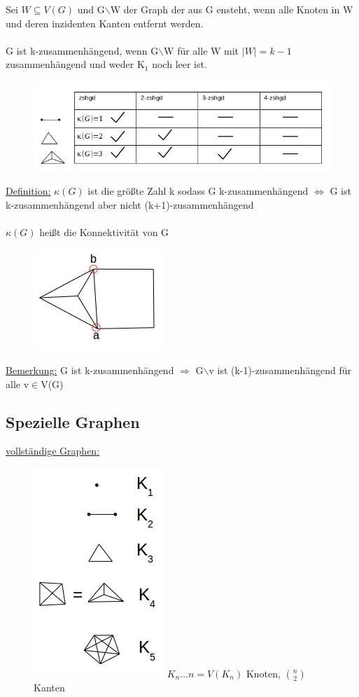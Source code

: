 Sei $W \subseteq V(G)$ und G$\backslash$W der Graph der aus G ensteht, wenn alle Knoten in W und deren inzidenten Kanten entfernt werden.
\\\\
G ist k-zusammenhängend, wenn G$\backslash$W für alle W mit $|W| = k-1$ zusammenhängend und weder K$_1$ noch leer ist.
\begin{figure}[htp]
\centering
\includegraphics[scale=1]{lectures/161021/pix/pic7.jpg}
\end{figure}

\underline{Definition:} $\kappa (G)$ ist die größte Zahl k sodass G k-zusammenhängend $\Leftrightarrow$ G ist k-zusammenhängend aber nicht (k+1)-zusammenhängend
\\\\
$\kappa(G)$ heißt die Konnektivität von G
\begin{figure}[htp]
\centering
\includegraphics[scale=1]{lectures/161021/pix/pic8.jpg}
\end{figure}

\underline{Bemerkung:} G ist k-zusammenhängend $\Rightarrow$ G$\backslash$v ist (k-1)-zusammenhängend für alle v$\in$V(G)

\newpage
\subsection{Spezielle Graphen}

\underline{vollständige Graphen:}
\begin{figure}[htp]
\centering
\includegraphics[scale=1]{lectures/161021/pix/pic9.jpg}
$K_n … n=V(K_n)$ Knoten, $\binom{n}{2}$ Kanten
\end{figure}

